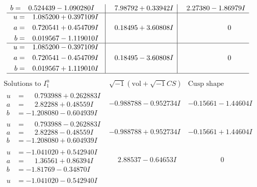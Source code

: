 \documentclass[1p]{elsarticle_modified}
\theoremstyle{definition}
\newcommand{\I}{\sqrt{-1}}
\begin{document}
$$\begin{array}{c|c|c}
\begin{aligned}
b &= \phantom{-}0.524439 - 1.090280 I\end{aligned}
 & \phantom{-}7.98792 + 0.33942 I & \phantom{-}2.27380 - 1.86979 I \\ \hline\begin{aligned}
u &= \phantom{-}1.085200 + 0.397109 I \\
a &= \phantom{-}0.720541 + 0.454709 I \\
b &= \phantom{-}0.019567 - 1.119010 I\end{aligned}
 & \phantom{-}0.18495 + 3.60808 I & \phantom{-0.000000 } 0 \\ \hline\begin{aligned}
u &= \phantom{-}1.085200 - 0.397109 I \\
a &= \phantom{-}0.720541 - 0.454709 I \\
b &= \phantom{-}0.019567 + 1.119010 I\end{aligned}
 & \phantom{-}0.18495 - 3.60808 I & \phantom{-0.000000 } 0\\
 \hline 
 \end{array}$$\newpage$$\begin{array}{c|c|c}  
\text{Solutions to }I^u_{1}& \I (\text{vol} + \sqrt{-1}CS) & \text{Cusp shape}\\
 \hline 
\begin{aligned}
u &= \phantom{-}0.793988 + 0.262883 I \\
a &= \phantom{-}2.82288 + 0.48559 I \\
b &= -1.208080 - 0.604939 I\end{aligned}
 & -0.988788 - 0.952734 I & -0.15661 - 1.44604 I \\ \hline\begin{aligned}
u &= \phantom{-}0.793988 - 0.262883 I \\
a &= \phantom{-}2.82288 - 0.48559 I \\
b &= -1.208080 + 0.604939 I\end{aligned}
 & -0.988788 + 0.952734 I & -0.15661 + 1.44604 I \\ \hline\begin{aligned}
u &= -1.041020 + 0.542940 I \\
a &= \phantom{-}1.36561 + 0.86394 I \\
b &= -1.81769 - 0.34870 I\end{aligned}
 & \phantom{-}2.88537 - 0.64653 I & \phantom{-0.000000 } 0 \\ \hline\begin{aligned}
u &= -1.041020 - 0.542940 I \\

\end{aligned}
\end{array}$$
\end{document}
